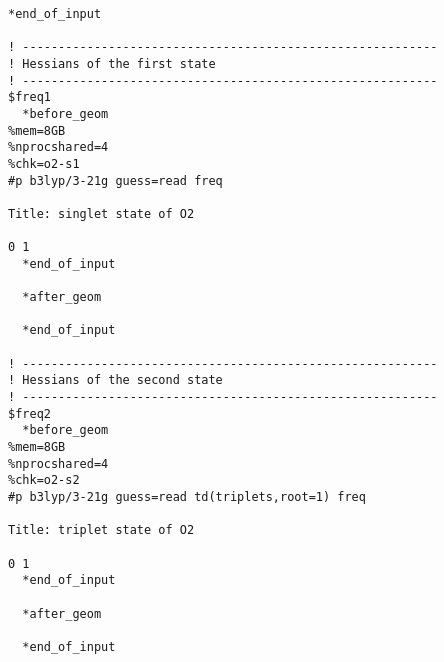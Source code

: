 \documentclass[UTF8]{article}
\begin{document}
\begin{lstlisting}[alsoletter={$*},
morekeywords={$sp1,$grad1,$freq1,$sp2,$grad2,$freq2,*before_geom,*after_geom,*end_of_input}]
  *end_of_input

! ----------------------------------------------------------
! Hessians of the first state
! ----------------------------------------------------------
$freq1
  *before_geom
%mem=8GB
%nprocshared=4
%chk=o2-s1
#p b3lyp/3-21g guess=read freq

Title: singlet state of O2

0 1
  *end_of_input

  *after_geom

  *end_of_input

! ----------------------------------------------------------
! Hessians of the second state
! ----------------------------------------------------------
$freq2
  *before_geom
%mem=8GB
%nprocshared=4
%chk=o2-s2
#p b3lyp/3-21g guess=read td(triplets,root=1) freq

Title: triplet state of O2

0 1
  *end_of_input

  *after_geom

  *end_of_input

\end{lstlisting}
\end{document}
